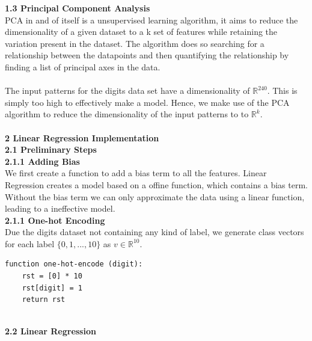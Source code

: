 \documentclass[a4paper]{article}
\begin{document}
\textbf{{\large 1.3 Principal Component Analysis}} \\

PCA in and of itself is a unsupervised learning algorithm, it aims to reduce the dimensionality of a given dataset to a k set of features while retaining the variation present in the dataset. The algorithm does so searching for a relationship between the datapoints and then quantifying the relationship by finding a list of principal axes in the data. \\ \\
The input patterns for the digits data set have a dimensionality of $\mathbb{R}^{240}$. This is simply too high to effectively make a model. Hence, we make use of the PCA algorithm to reduce the dimensionality of the input patterns to to $\mathbb{R}^{k}$. \\
\\

\textbf{{\Large 2 Linear Regression Implementation}} \\ 

\textbf{{\large 2.1 Preliminary Steps}} \\ 

\textbf{2.1.1 Adding Bias} \\

We first create a function to add a bias term to all the features. Linear Regression creates a model based on a offine function, which contains a bias term. Without the bias term we can only approximate the data using a linear function, leading to a ineffective model. \\


\textbf{2.1.1 One-hot Encoding} \\

Due the digits dataset not containing any kind of label, we generate class vectors for each label $\{0,1,...,10\}$ as $v \in \mathbb{R}^{10}$. \\

\begin{lstlisting}
function one-hot-encode (digit):
    rst = [0] * 10
    rst[digit] = 1
    return rst 
\end{lstlisting}
\qquad \\

\textbf{{\large 2.2 Linear Regression}} \\
\end{document}
